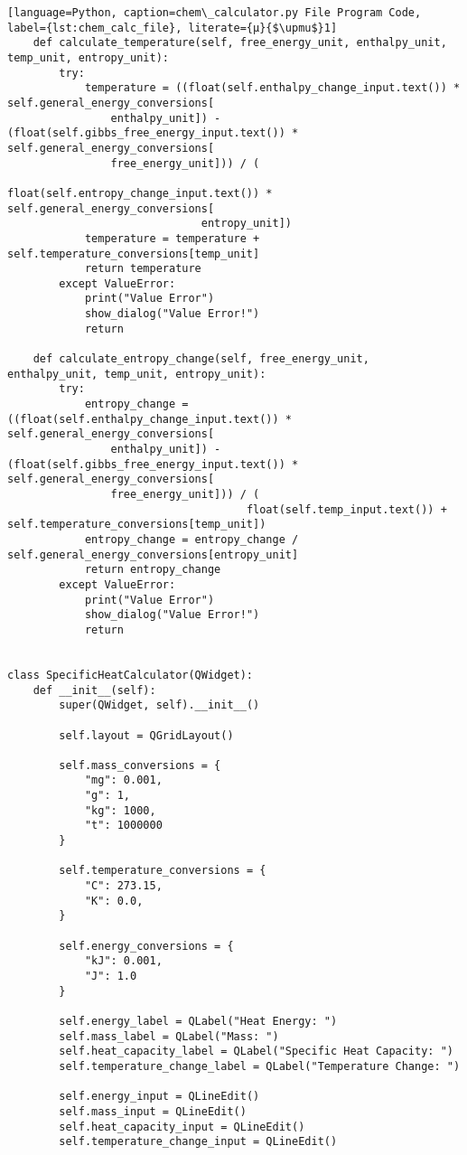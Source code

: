 \begin{lstlisting}[language=Python, caption=chem\_calculator.py File Program Code, label={lst:chem_calc_file}, literate={μ}{$\upmu$}1]
    def calculate_temperature(self, free_energy_unit, enthalpy_unit, temp_unit, entropy_unit):
        try:
            temperature = ((float(self.enthalpy_change_input.text()) * self.general_energy_conversions[
                enthalpy_unit]) - (float(self.gibbs_free_energy_input.text()) * self.general_energy_conversions[
                free_energy_unit])) / (
                                  float(self.entropy_change_input.text()) * self.general_energy_conversions[
                              entropy_unit])
            temperature = temperature + self.temperature_conversions[temp_unit]
            return temperature
        except ValueError:
            print("Value Error")
            show_dialog("Value Error!")
            return

    def calculate_entropy_change(self, free_energy_unit, enthalpy_unit, temp_unit, entropy_unit):
        try:
            entropy_change = ((float(self.enthalpy_change_input.text()) * self.general_energy_conversions[
                enthalpy_unit]) - (float(self.gibbs_free_energy_input.text()) * self.general_energy_conversions[
                free_energy_unit])) / (
                                     float(self.temp_input.text()) + self.temperature_conversions[temp_unit])
            entropy_change = entropy_change / self.general_energy_conversions[entropy_unit]
            return entropy_change
        except ValueError:
            print("Value Error")
            show_dialog("Value Error!")
            return


class SpecificHeatCalculator(QWidget):
    def __init__(self):
        super(QWidget, self).__init__()

        self.layout = QGridLayout()

        self.mass_conversions = {
            "mg": 0.001,
            "g": 1,
            "kg": 1000,
            "t": 1000000
        }

        self.temperature_conversions = {
            "C": 273.15,
            "K": 0.0,
        }

        self.energy_conversions = {
            "kJ": 0.001,
            "J": 1.0
        }

        self.energy_label = QLabel("Heat Energy: ")
        self.mass_label = QLabel("Mass: ")
        self.heat_capacity_label = QLabel("Specific Heat Capacity: ")
        self.temperature_change_label = QLabel("Temperature Change: ")

        self.energy_input = QLineEdit()
        self.mass_input = QLineEdit()
        self.heat_capacity_input = QLineEdit()
        self.temperature_change_input = QLineEdit()


\end{lstlisting}
